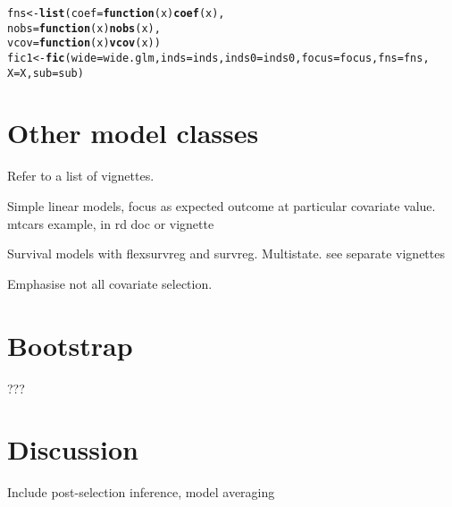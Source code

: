 \documentclass[article,shortnames,nojss,nofooter]{jss}\usepackage[]{graphicx}\usepackage[]{color}
\makeatletter
\newcommand{\hlstd}[1]{\textcolor[rgb]{0.345,0.345,0.345}{#1}}%
\newcommand{\hlkwa}[1]{\textcolor[rgb]{0.161,0.373,0.58}{\textbf{#1}}}%
\newcommand{\hlkwb}[1]{\textcolor[rgb]{0.69,0.353,0.396}{#1}}%
\newcommand{\hlkwc}[1]{\textcolor[rgb]{0.333,0.667,0.333}{#1}}%
\newcommand{\hlkwd}[1]{\textcolor[rgb]{0.737,0.353,0.396}{\textbf{#1}}}%
\newenvironment{kframe}{%
 \def\at@end@of@kframe{}%
 \ifinner\ifhmode%
  \def\at@end@of@kframe{\end{minipage}}%
  \begin{minipage}{\columnwidth}%
 \fi\fi%
 \def\FrameCommand##1{\hskip\@totalleftmargin \hskip-\fboxsep
 \colorbox{shadecolor}{##1}\hskip-\fboxsep
     \hskip-\linewidth \hskip-\@totalleftmargin \hskip\columnwidth}%
 \MakeFramed {\advance\hsize-\width
   \@totalleftmargin\z@ \linewidth\hsize
   \@setminipage}}%
 {\par\unskip\endMakeFramed%
 \at@end@of@kframe}
\newenvironment{knitrout}{}{} %
\makeatother
\begin{document}
\begin{knitrout}
\color{fgcolor}\begin{kframe}
\begin{alltt}
\hlstd{fns} \hlkwb{<-} \hlkwd{list}\hlstd{(}\hlkwc{coef} \hlstd{=} \hlkwa{function}\hlstd{(}\hlkwc{x}\hlstd{)}\hlkwd{coef}\hlstd{(x),}
            \hlkwc{nobs} \hlstd{=} \hlkwa{function}\hlstd{(}\hlkwc{x}\hlstd{)}\hlkwd{nobs}\hlstd{(x),}
            \hlkwc{vcov} \hlstd{=} \hlkwa{function}\hlstd{(}\hlkwc{x}\hlstd{)}\hlkwd{vcov}\hlstd{(x))}
\hlstd{fic1} \hlkwb{<-} \hlkwd{fic}\hlstd{(}\hlkwc{wide}\hlstd{=wide.glm,} \hlkwc{inds}\hlstd{=inds,} \hlkwc{inds0}\hlstd{=inds0,} \hlkwc{focus}\hlstd{=focus,} \hlkwc{fns}\hlstd{=fns,}
            \hlkwc{X}\hlstd{=X,} \hlkwc{sub}\hlstd{=sub)}
\end{alltt}


{\ttfamily\noindent\bfseries\color{errorcolor}{\#\# Error in get\_parsub(sub, length(par), inds, inds0, gamma0, fns\$coef, wide): `sub` of length 26, should be 2, the same as the number of rows of `inds`}}\end{kframe}
\end{knitrout}


\section{Other model classes }

Refer to a list of vignettes. 

Simple linear models, focus as expected outcome at particular covariate value.  mtcars example, in rd doc or vignette

Survival models with flexsurvreg and survreg.  Multistate. see
separate vignettes 

Emphasise not all covariate selection. 




\section{Bootstrap}

???




\section{Discussion}

Include post-selection inference, model averaging 



\end{document}
